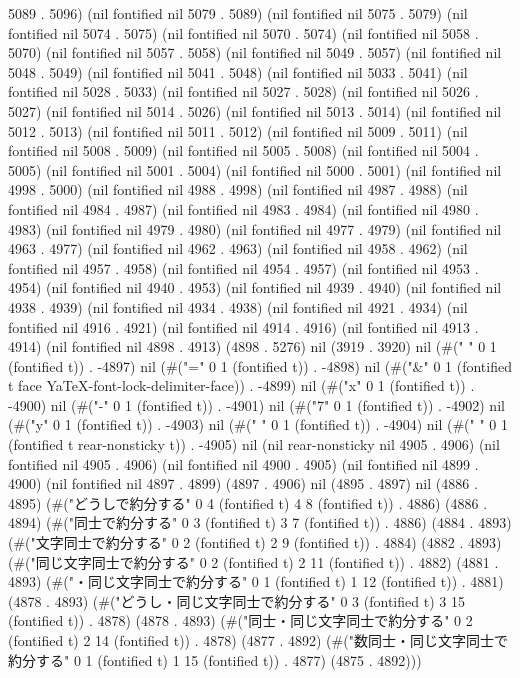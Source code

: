 5089 . 5096) (nil fontified nil 5079 . 5089) (nil fontified nil 5075 . 5079) (nil fontified nil 5074 . 5075) (nil fontified nil 5070 . 5074) (nil fontified nil 5058 . 5070) (nil fontified nil 5057 . 5058) (nil fontified nil 5049 . 5057) (nil fontified nil 5048 . 5049) (nil fontified nil 5041 . 5048) (nil fontified nil 5033 . 5041) (nil fontified nil 5028 . 5033) (nil fontified nil 5027 . 5028) (nil fontified nil 5026 . 5027) (nil fontified nil 5014 . 5026) (nil fontified nil 5013 . 5014) (nil fontified nil 5012 . 5013) (nil fontified nil 5011 . 5012) (nil fontified nil 5009 . 5011) (nil fontified nil 5008 . 5009) (nil fontified nil 5005 . 5008) (nil fontified nil 5004 . 5005) (nil fontified nil 5001 . 5004) (nil fontified nil 5000 . 5001) (nil fontified nil 4998 . 5000) (nil fontified nil 4988 . 4998) (nil fontified nil 4987 . 4988) (nil fontified nil 4984 . 4987) (nil fontified nil 4983 . 4984) (nil fontified nil 4980 . 4983) (nil fontified nil 4979 . 4980) (nil fontified nil 4977 . 4979) (nil fontified nil 4963 . 4977) (nil fontified nil 4962 . 4963) (nil fontified nil 4958 . 4962) (nil fontified nil 4957 . 4958) (nil fontified nil 4954 . 4957) (nil fontified nil 4953 . 4954) (nil fontified nil 4940 . 4953) (nil fontified nil 4939 . 4940) (nil fontified nil 4938 . 4939) (nil fontified nil 4934 . 4938) (nil fontified nil 4921 . 4934) (nil fontified nil 4916 . 4921) (nil fontified nil 4914 . 4916) (nil fontified nil 4913 . 4914) (nil fontified nil 4898 . 4913) (4898 . 5276) nil (3919 . 3920) nil (#(" " 0 1 (fontified t)) . -4897) nil (#("=" 0 1 (fontified t)) . -4898) nil (#("&" 0 1 (fontified t face YaTeX-font-lock-delimiter-face)) . -4899) nil (#("x" 0 1 (fontified t)) . -4900) nil (#("-" 0 1 (fontified t)) . -4901) nil (#("7" 0 1 (fontified t)) . -4902) nil (#("y" 0 1 (fontified t)) . -4903) nil (#(" " 0 1 (fontified t)) . -4904) nil (#("
" 0 1 (fontified t rear-nonsticky t)) . -4905) nil (nil rear-nonsticky nil 4905 . 4906) (nil fontified nil 4905 . 4906) (nil fontified nil 4900 . 4905) (nil fontified nil 4899 . 4900) (nil fontified nil 4897 . 4899) (4897 . 4906) nil (4895 . 4897) nil (4886 . 4895) (#("どうしで約分する" 0 4 (fontified t) 4 8 (fontified t)) . 4886) (4886 . 4894) (#("同士で約分する" 0 3 (fontified t) 3 7 (fontified t)) . 4886) (4884 . 4893) (#("文字同士で約分する" 0 2 (fontified t) 2 9 (fontified t)) . 4884) (4882 . 4893) (#("同じ文字同士で約分する" 0 2 (fontified t) 2 11 (fontified t)) . 4882) (4881 . 4893) (#("・同じ文字同士で約分する" 0 1 (fontified t) 1 12 (fontified t)) . 4881) (4878 . 4893) (#("どうし・同じ文字同士で約分する" 0 3 (fontified t) 3 15 (fontified t)) . 4878) (4878 . 4893) (#("同士・同じ文字同士で約分する" 0 2 (fontified t) 2 14 (fontified t)) . 4878) (4877 . 4892) (#("数同士・同じ文字同士で約分する" 0 1 (fontified t) 1 15 (fontified t)) . 4877) (4875 . 4892)))
